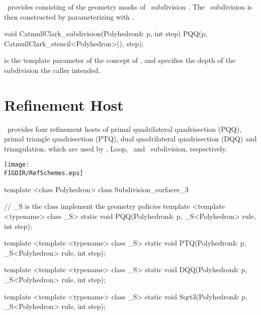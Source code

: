 \ provides  consisting of the 
geometry masks of \CC\ subdivision \cite{cgal:cc-sub-78}. 
The \CC\ subdivision is then constructed by parameterizing 
 with 
.

\begin{ccExampleCode}
  void CatmullClark_subdivision(Polyhedron& p, int step) {
    PQQ(p, CatmullClark_stencil<Polyhedron>(), step);
  }
\end{ccExampleCode}

 is the template parameter of the concept of
, and  specifies the
depth of the subdivision the caller intended.


\section{Refinement Host}
\ provides four refinement hosts of primal 
quadrilateral quadrisection (PQQ), primal triangle 
quadrisection (PTQ), dual quadrilateral 
quadrisection (DQQ) and  triangulation, which 
are used by \CC, Loop, \DS\ and \ subdivision, 
respectively. 

\begin{ccTexOnly}
  \begin{center}
    \parbox{0.6\textwidth}{%
      \texttt{[image: \\FIGDIR/RefSchemes.eps]}%
    }
  \end{center}
\end{ccTexOnly}



\begin{ccExampleCode}
template <class Polyhedron>
class Subdivision_surfaces_3 {
  // _S is the class implement the geometry policies
  template <template <typename> class _S>
  static void PQQ(Polyhedron& p, _S<Polyhedron> rule, int step);

  template <template <typename> class _S>
  static void PTQ(Polyhedron& p, _S<Polyhedron> rule, int step);

  template <template <typename> class _S>
  static void DQQ(Polyhedron& p, _S<Polyhedron> rule, int step);

  template <template <typename> class _S>
  static void Sqrt3(Polyhedron& p, _S<Polyhedron> rule, int step);
}
\end{ccExampleCode}


